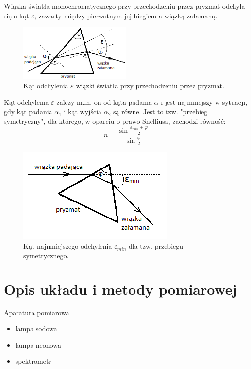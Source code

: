 \documentclass[a4paper,10pt]{article}
\begin{document}
Wiązka światła monochromatycznego przy przechodzeniu przez pryzmat odchyla się o kąt $\varepsilon$, zawarty między pierwotnym jej biegiem a wiązką załamaną. 
\begin{figure} [H]
  \centering
  \includegraphics[width=0.5\textwidth]{./epsilon.png}
  \caption{Kąt odchylenia $\varepsilon$ wiązki światła przy przechodzeniu przez pryzmat.}
  \label{}
\end{figure}

Kąt odchylenia $\varepsilon$ zależy m.in. on od kąta padania $\alpha$ i jest najmniejszy w sytuacji, gdy kąt padania $\alpha_1$ i kąt wyjścia $\alpha_2$ są równe. Jest to tzw. "przebieg symetryczny", dla którego, w oparciu o prawo Snelliusa, zachodzi równość:
\begin{equation}
n = \frac{\sin \frac{\varepsilon_{min}+\varphi}{2}}{\sin \frac{\varphi}{2}}
\end{equation}
\begin{figure} [H]
  \centering
  \includegraphics{./epsilon_min.png}
  \caption{Kąt najmniejszego odchylenia $\varepsilon_{min}$ dla tzw. przebiegu symetrycznego.}
  \label{}
\end{figure}

\section{Opis układu i metody pomiarowej}
Aparatura pomiarowa
\begin{itemize}
  \item lampa sodowa
  \item lampa neonowa
  \item spektrometr
\end{itemize}
\end{document}
